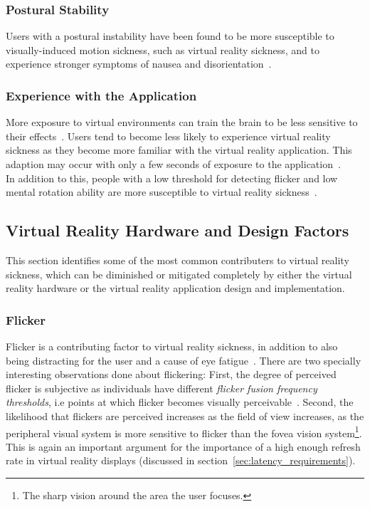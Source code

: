 \subsubsection{Postural Stability}
Users with a postural instability have been found to be more susceptible to visually-induced motion sickness, such as virtual reality sickness, and to experience
stronger symptoms of nausea and disorientation~\citep{Kolasinski1995}. 

\subsubsection{Experience with the Application}
More exposure to virtual environments can train the brain to be less sensitive to their effects~\citep{Stanney2003}. Users tend to become less likely to experience
virtual reality sickness as they become more familiar with the virtual reality application. 
This adaption may occur with only a few seconds of exposure to the application~\citep{Kennedy1985}.\\

In addition to this, people with a low threshold for detecting flicker and low mental rotation ability are more susceptible to virtual reality sickness~\cite{Kolasinski1995}.

\subsection{Virtual Reality Hardware and Design Factors}
This section identifies some of the most common contributers to virtual reality sickness, which can be diminished or mitigated completely by either the virtual reality hardware
or the virtual reality application design and implementation. 

\subsubsection{Flicker}
Flicker is a contributing factor to virtual reality sickness, in addition to also being distracting for the user and a cause of eye fatigue~\citep{Jr2000}.
There are two specially interesting observations done about flickering: First, the degree of perceived flicker is subjective as 
individuals have different \textit{flicker fusion frequency thresholds}, i.e points at which flicker becomes visually perceivable~\citep{Pausch1992}.
Second, the likelihood that flickers are perceived increases as the field of view increases, as the peripheral visual system is more sensitive to flicker than 
the fovea vision system\footnote{The sharp vision around the area the user focuses.}. This is again an important argument for the importance of a high enough
refresh rate in virtual reality displays (discussed in section~\vref{sec:latency_requirements}). 

